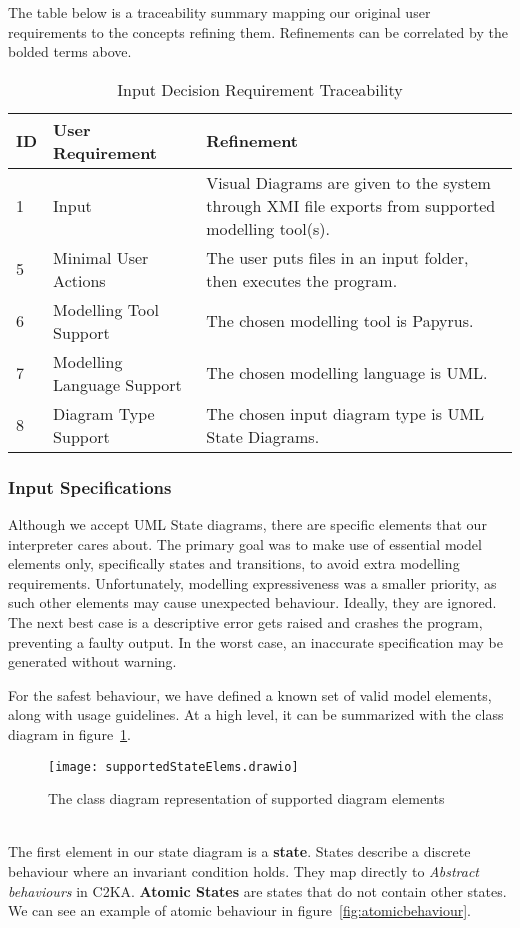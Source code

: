 The table below is a traceability summary mapping our original user requirements to the concepts refining them.
Refinements can be correlated by the bolded terms above.

\begin{table}[htbp]
    \centering
    \caption{Input Decision Requirement Traceability}\label{tab:input-table}
    \begin{tabularx}{\textwidth}{| l | l | X |}
        \hline
        \textbf{ID} & \textbf{User Requirement} & \textbf{Refinement} \\
        \hline
        1 & Input & Visual Diagrams are given to the system through XMI file exports from supported modelling tool(s). \\ \hline
        5 & Minimal User Actions & The user puts files in an input folder, then executes the program.  \\ \hline
        6 & Modelling Tool Support & The chosen modelling tool is Papyrus. \\ \hline
        7 & Modelling Language Support & The chosen modelling language is UML. \\ \hline
        8 & Diagram Type Support & The chosen input diagram type is UML State Diagrams. \\ \hline
    \end{tabularx}
\end{table}

\newpage
\subsubsection{Input Specifications}\label{subsubsec:input-specification}
Although we accept UML State diagrams, there are specific elements that our interpreter cares about.
The primary goal was to make use of essential model elements only, specifically states and transitions,
to avoid extra modelling requirements.
Unfortunately, modelling expressiveness was a smaller priority, as such
other elements may cause unexpected behaviour.
Ideally, they are ignored.
The next best case is a descriptive error gets raised and crashes the program, preventing a faulty output.
In the worst case, an inaccurate specification may be generated without warning.

For the safest behaviour, we have defined a known set of valid model elements, along with usage guidelines.
At a high level, it can be summarized with the class diagram in figure~\ref{fig:supportedElems}.
\begin{figure}[ht]
    \centering
    \texttt{[image: supportedStateElems.drawio]}
    \caption{The class diagram representation of supported diagram elements}
    \label{fig:supportedElems}
\end{figure}
\\
The first element in our state diagram is a \textbf{state}.
States describe a discrete behaviour where an invariant condition holds.
They map directly to \textit{Abstract behaviours} in C2KA\@.
\textbf{Atomic States} are states that do not contain other states.
We can see an example of atomic behaviour in figure~\ref{fig:atomicbehaviour}.

